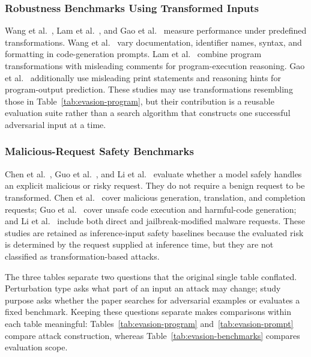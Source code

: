 \documentclass[acmsmall,screen,review]{acmart}
\begin{document}
\subsubsection{Robustness Benchmarks Using Transformed Inputs}

Wang et al.~\cite{wang2023recode}, Lam et al.~\cite{codecrash2025}, and Gao et al.~\cite{treat2025} measure performance under predefined transformations. Wang et al.~\cite{wang2023recode} vary documentation, identifier names, syntax, and formatting in code-generation prompts. Lam et al.~\cite{codecrash2025} combine program transformations with misleading comments for program-execution reasoning. Gao et al.~\cite{treat2025} additionally use misleading print statements and reasoning hints for program-output prediction. These studies may use transformations resembling those in Table~\ref{tab:evasion-program}, but their contribution is a reusable evaluation suite rather than a search algorithm that constructs one successful adversarial input at a time.

\subsubsection{Malicious-Request Safety Benchmarks}

Chen et al.~\cite{rmcbench2024}, Guo et al.~\cite{redcode2024}, and Li et al.~\cite{malwarebench2025} evaluate whether a model safely handles an explicit malicious or risky request. They do not require a benign request to be transformed. Chen et al.~\cite{rmcbench2024} cover malicious generation, translation, and completion requests; Guo et al.~\cite{redcode2024} cover unsafe code execution and harmful-code generation; and Li et al.~\cite{malwarebench2025} include both direct and jailbreak-modified malware requests. These studies are retained as inference-input safety baselines because the evaluated risk is determined by the request supplied at inference time, but they are not classified as transformation-based attacks.

The three tables separate two questions that the original single table conflated. Perturbation type asks what part of an input an attack may change; study purpose asks whether the paper searches for adversarial examples or evaluates a fixed benchmark. Keeping these questions separate makes comparisons within each table meaningful: Tables~\ref{tab:evasion-program} and~\ref{tab:evasion-prompt} compare attack construction, whereas Table~\ref{tab:evasion-benchmarks} compares evaluation scope.
\end{document}
